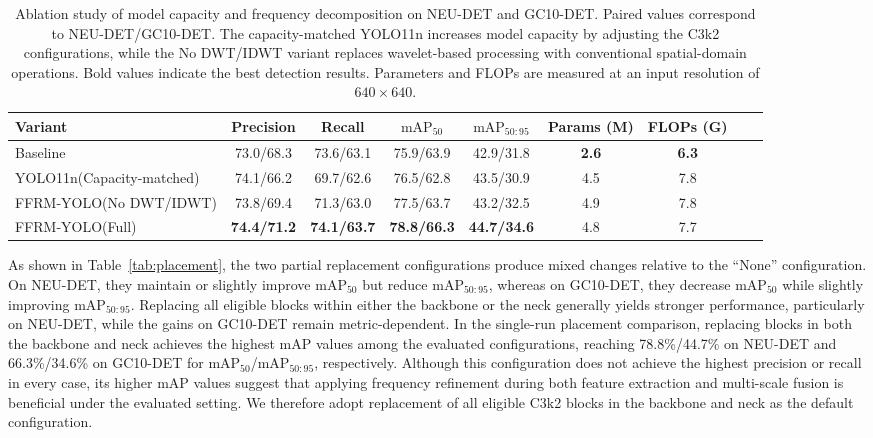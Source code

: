 \documentclass[pdflatex,sn-nature]{sn-jnl}
\begin{document}
\begin{table}[!t]
\caption{Ablation study of model capacity and frequency decomposition
on NEU-DET and GC10-DET. Paired values correspond to
NEU-DET/GC10-DET. The capacity-matched YOLO11n increases
model capacity by adjusting the C3k2 configurations, while
the No DWT/IDWT variant replaces wavelet-based processing
with conventional spatial-domain operations. Bold values
indicate the best detection results. Parameters and FLOPs
are measured at an input resolution of $640\times640$.}
\label{tab:ffrm_dwt}
\centering
\footnotesize
\setlength{\tabcolsep}{1.8pt}
\renewcommand{\arraystretch}{1.1}
\begin{tabular*}{\columnwidth}{@{\extracolsep{\fill}}lcccccccc@{}}
\toprule
Variant & Precision & Recall & $\mathrm{mAP}_{50}$ & $\mathrm{mAP}_{50:95}$&Params (M)& FLOPs (G) \\
\midrule
Baseline  &73.0/68.3& 73.6/63.1 & 75.9/63.9 & 42.9/31.8 & \textbf{2.6} & \textbf{6.3} \\
YOLO11n(Capacity-matched)   &74.1/66.2  &69.7/62.6  &76.5/62.8 &43.5/30.9  & 4.5 & 7.8\\
FFRM-YOLO(No DWT/IDWT)  &73.8/69.4  &71.3/63.0   &77.5/63.7  & 43.2/32.5 & 4.9 & 7.8\\
FFRM-YOLO(Full)    & \textbf{74.4/71.2} & \textbf{74.1/63.7} & \textbf{78.8/66.3} & \textbf{44.7/34.6} & 4.8 & 7.7\\
\bottomrule
\end{tabular*}
\end{table}


As shown in Table~\ref{tab:placement}, the two partial replacement configurations produce mixed changes relative to the ``None'' configuration. On NEU-DET, they maintain or slightly improve $\mathrm{mAP}_{50}$ but reduce $\mathrm{mAP}_{50:95}$, whereas on GC10-DET, they decrease $\mathrm{mAP}_{50}$ while slightly improving $\mathrm{mAP}_{50:95}$. Replacing all eligible blocks within either the backbone or the neck generally yields stronger performance, particularly on NEU-DET, while the gains on GC10-DET remain metric-dependent. In the single-run placement comparison, replacing blocks in both the backbone and neck achieves the highest mAP values among the evaluated configurations, reaching 78.8\%/44.7\% on NEU-DET and 66.3\%/34.6\% on GC10-DET for mAP\(_{50}\)/mAP\(_{50:95}\), respectively. Although this configuration does not achieve the highest precision or recall in every case, its higher mAP values suggest that applying frequency refinement during both feature extraction and multi-scale fusion is beneficial under the evaluated setting. We therefore adopt replacement of all eligible C3k2 blocks in the backbone and neck as the default configuration.
\end{document}
